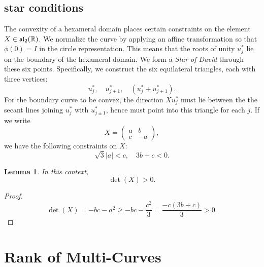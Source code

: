 \documentclass[11pt]{amsart}
\newtheorem{lemma}{Lemma}
\newcommand{\ring}[1]{\mathbb{#1}}
\begin{document}
\subsection{star conditions}\label{sec:star}

The convexity of a hexameral domain places certain constraints on the
element $X\in\frak{sl}_2(\ring{R})$.  We normalize the curve by applying
an affine transformation so that $\phi(0)=I$ in the circle representation.
This means that the roots of unity $u^*_j$ lie on the boundary of 
the hexameral domain.  We form a {\it Star of David} through these six points.
Specifically, we construct the six equilateral triangles, each with three
vertices:
   $$
   u^*_j,\quad u^*_{j+1},\quad (u^*_j + u^*_{j+1}).
$$
For the boundary curve to be convex, the direction $X u^*_j$ must lie between
the the secant lines joining $u^*_j$ with $u^*_{j\pm 1}$, hence
must point into this triangle for each $j$.  If we write
$$X  = \left(\begin{matrix} a & b \\ c & -a \end{matrix}\right),$$
we have the following constraints on $X$:
$$
\sqrt{3} |a| < c,\quad 3 b + c < 0.
$$

\begin{lemma}
In this context,
$$\det(X) > 0.$$
\end{lemma}

\begin{proof} 
$$\det(X) = - b c - a^2 \ge - b c  - \frac{c^2}{3} = \frac{-c(3 b + c)}{3} >0.$$
\end{proof}



\section{Rank of Multi-Curves}


\end{document}
